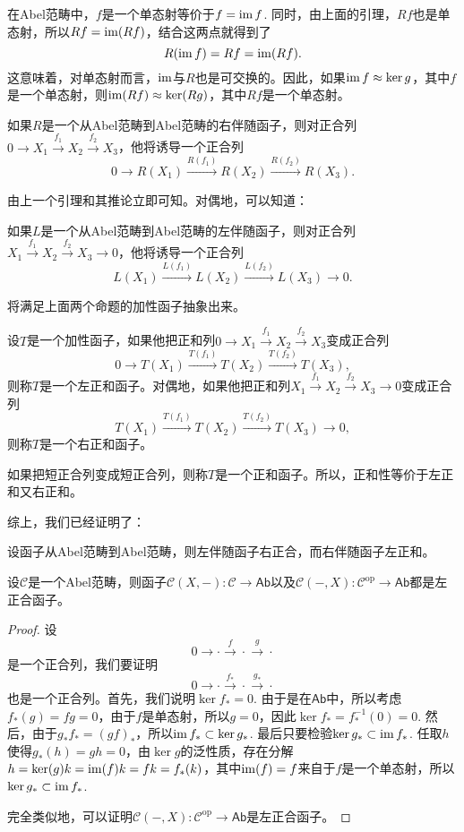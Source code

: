 在Abel范畴中，$f$是一个单态射等价于$f=\operatorname{im} f$. 同时，由上面的引理，$Rf$也是单态射，所以$Rf=\operatorname{im}(Rf)$，结合这两点就得到了
\[
	R(\operatorname{im} f)=Rf=\operatorname{im}(Rf).
\]
这意味着，对单态射而言，$\operatorname{im}$与$R$也是可交换的。因此，如果$\operatorname{im} f\approx \ker g$，其中$f$是一个单态射，则$\operatorname{im}(Rf)\approx \ker(Rg)$，其中$Rf$是一个单态射。

\begin{pro}
如果$R$是一个从Abel范畴到Abel范畴的右伴随函子，则对正合列$0\to X_1\xrightarrow{f_1} X_2\xrightarrow{f_2} X_3$，他将诱导一个正合列
\[
	0\to R(X_1)\xrightarrow{R(f_1)} R(X_2)\xrightarrow{R(f_2)} R(X_3).
\]
\end{pro}

由上一个引理和其推论立即可知。对偶地，可以知道：

\begin{pro}
如果$L$是一个从Abel范畴到Abel范畴的左伴随函子，则对正合列$X_1\xrightarrow{f_1} X_2\xrightarrow{f_2} X_3 \to 0$，他将诱导一个正合列
\[
	L(X_1)\xrightarrow{L(f_1)} L(X_2)\xrightarrow{L(f_2)} L(X_3) \to 0.
\]
\end{pro}

将满足上面两个命题的加性函子抽象出来。

\begin{para}
设$T$是一个加性函子，如果他把正和列$0\to X_1\xrightarrow{f_1} X_2\xrightarrow{f_2} X_3$变成正合列
\[
	0\to T(X_1)\xrightarrow{T(f_1)} T(X_2)\xrightarrow{T(f_2)} T(X_3),
\]
则称$T$是一个左正和函子。对偶地，如果他把正和列$X_1\xrightarrow{f_1} X_2\xrightarrow{f_2} X_3\to 0$变成正合列
\[
	T(X_1)\xrightarrow{T(f_1)} T(X_2)\xrightarrow{T(f_2)} T(X_3)\to 0,
\]
则称$T$是一个右正和函子。

如果把短正合列变成短正合列，则称$T$是一个正和函子。所以，正和性等价于左正和又右正和。
\end{para}

综上，我们已经证明了：

\begin{thm}
设函子从Abel范畴到Abel范畴，则左伴随函子右正合，而右伴随函子左正和。
\end{thm}

\begin{pro}
设$\mathcal{C}$是一个Abel范畴，则函子$\mathcal{C}(X,-):\mathcal{C}\to \mathsf{Ab}$以及$\mathcal{C}(-,X):\mathcal{C}^\mathrm{op} \to \mathsf{Ab}$都是左正合函子。
\end{pro}

\begin{proof}
	设
	\[
		0\to\cdot \xrightarrow{f}\cdot \xrightarrow{g}\cdot
	\]
	是一个正合列，我们要证明
	\[
	0\to \cdot \xrightarrow{f_*}\cdot \xrightarrow{g_*}\cdot
	\]
	也是一个正合列。首先，我们说明$\ker f_*=0$. 由于是在$\mathsf{Ab}$中，所以考虑$f_*(g)=fg=0$，由于$f$是单态射，所以$g=0$，因此$\ker f_*=f_*^{-1}(0)=0$. 然后，由于$g_*f_*=(gf)_*$，所以$\operatorname{im} f_*\subset \ker g_*$. 最后只要检验$\ker g_*\subset \operatorname{im} f_*$. 任取$h$使得$g_*(h)=gh=0$，由$\ker g$的泛性质，存在分解$h=\ker(g)k=\operatorname{im}(f)k=fk=f_*(k)$，其中$\operatorname{im}(f)=f$来自于$f$是一个单态射，所以$\ker g_* \subset \operatorname{im} f_*$.

	完全类似地，可以证明$\mathcal{C}(-,X):\mathcal{C}^\text{op} \to \mathsf{Ab}$是左正合函子。
\end{proof}

